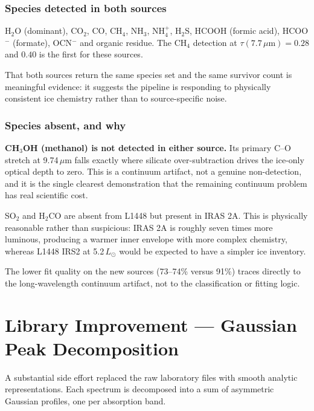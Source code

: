 \documentclass[11pt,a4paper]{article}
\newcommand{\um}{\,$\mu$m}
\newcommand{\htwoo}{H$_2$O}
\newcommand{\cotwo}{CO$_2$}
\newcommand{\chthreeoh}{CH$_3$OH}
\newcommand{\nhfour}{NH$_4^+$}
\newcommand{\ocn}{OCN$^-$}
\begin{document}
\subsubsection*{Species detected in both sources}

\htwoo{} (dominant), \cotwo, CO, CH$_4$, NH$_3$, \nhfour, H$_2$S, HCOOH
(formic acid), HCOO$^-$ (formate), \ocn{} and organic residue. The CH$_4$
detection at $\tau(7.7\,\mu\text{m}) = 0.28$ and $0.40$ is the first for
these sources.

That both sources return the same species set and the same survivor count
is meaningful evidence: it suggests the pipeline is responding to
physically consistent ice chemistry rather than to source-specific noise.

\subsubsection*{Species absent, and why}

\begin{goldbox}
\textbf{\chthreeoh{} (methanol) is not detected in either source.} Its
primary C--O stretch at 9.74\um{} falls exactly where silicate
over-subtraction drives the ice-only optical depth to zero. This is a
continuum artifact, not a genuine non-detection, and it is the single
clearest demonstration that the remaining continuum problem has real
scientific cost.
\end{goldbox}

SO$_2$ and H$_2$CO are absent from L1448 but present in IRAS 2A. This is
physically reasonable rather than suspicious: IRAS 2A is roughly seven
times more luminous, producing a warmer inner envelope with more complex
chemistry, whereas L1448 IRS2 at 5.2\,$L_\odot$ would be expected to have a
simpler ice inventory.

The lower fit quality on the new sources (73--74\% versus 91\%) traces
directly to the long-wavelength continuum artifact, not to the
classification or fitting logic.

\section{Library Improvement --- Gaussian Peak Decomposition}

A substantial side effort replaced the raw laboratory files with smooth
analytic representations. Each spectrum is decomposed into a sum of
asymmetric Gaussian profiles, one per absorption band.
\end{document}

